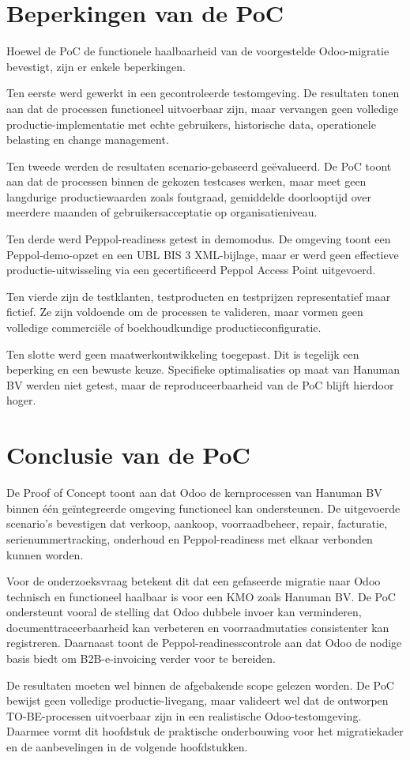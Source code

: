 \section{Beperkingen van de PoC}
\label{sec:poc-beperkingen}

Hoewel de PoC de functionele haalbaarheid van de voorgestelde Odoo-migratie bevestigt, zijn er enkele beperkingen.

Ten eerste werd gewerkt in een gecontroleerde testomgeving. De resultaten tonen aan dat de processen functioneel uitvoerbaar zijn, maar vervangen geen volledige productie-implementatie met echte gebruikers, historische data, operationele belasting en change management.

Ten tweede werden de resultaten scenario-gebaseerd geëvalueerd. De PoC toont aan dat de processen binnen de gekozen testcases werken, maar meet geen langdurige productiewaarden zoals foutgraad, gemiddelde doorlooptijd over meerdere maanden of gebruikersacceptatie op organisatieniveau.

Ten derde werd Peppol-readiness getest in demomodus. De omgeving toont een Peppol-demo-opzet en een UBL BIS 3 XML-bijlage, maar er werd geen effectieve productie-uitwisseling via een gecertificeerd Peppol Access Point uitgevoerd.

Ten vierde zijn de testklanten, testproducten en testprijzen representatief maar fictief. Ze zijn voldoende om de processen te valideren, maar vormen geen volledige commerciële of boekhoudkundige productieconfiguratie.

Ten slotte werd geen maatwerkontwikkeling toegepast. Dit is tegelijk een beperking en een bewuste keuze. Specifieke optimalisaties op maat van Hanuman BV werden niet getest, maar de reproduceerbaarheid van de PoC blijft hierdoor hoger.

\section{Conclusie van de PoC}
\label{sec:poc-conclusie}

De Proof of Concept toont aan dat Odoo de kernprocessen van Hanuman BV binnen één geïntegreerde omgeving functioneel kan ondersteunen. De uitgevoerde scenario's bevestigen dat verkoop, aankoop, voorraadbeheer, repair, facturatie, serienummertracking, onderhoud en Peppol-readiness met elkaar verbonden kunnen worden.

Voor de onderzoeksvraag betekent dit dat een gefaseerde migratie naar Odoo technisch en functioneel haalbaar is voor een KMO zoals Hanuman BV. De PoC ondersteunt vooral de stelling dat Odoo dubbele invoer kan verminderen, documenttraceerbaarheid kan verbeteren en voorraadmutaties consistenter kan registreren. Daarnaast toont de Peppol-readinesscontrole aan dat Odoo de nodige basis biedt om B2B-e-invoicing verder voor te bereiden.

De resultaten moeten wel binnen de afgebakende scope gelezen worden. De PoC bewijst geen volledige productie-livegang, maar valideert wel dat de ontworpen TO-BE-processen uitvoerbaar zijn in een realistische Odoo-testomgeving. Daarmee vormt dit hoofdstuk de praktische onderbouwing voor het migratiekader en de aanbevelingen in de volgende hoofdstukken.